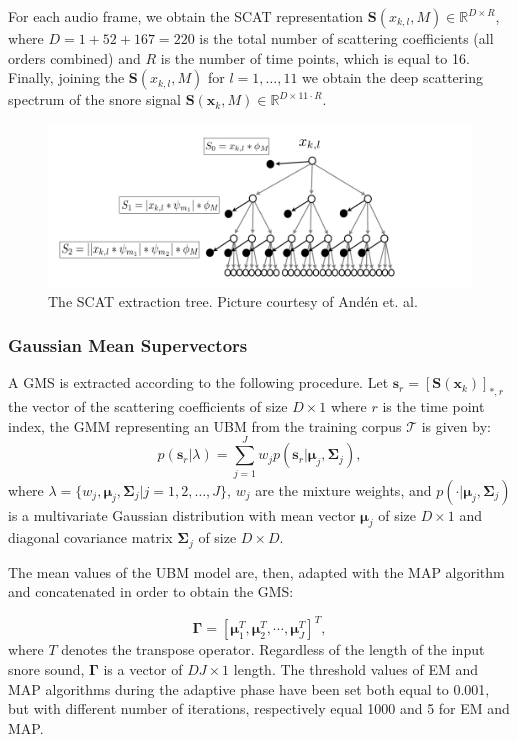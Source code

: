 For each audio frame, we obtain the SCAT representation $\mathbf{S}(x_{k,l}, M) \in \mathbb{R}^{D \times R}$, where $D=1+52+167=220$ is the total number of scattering coefficients (all orders combined) and $R$ is the number of time points, which is equal to 16. Finally, joining the $\mathbf{S}(x_{k,l}, M)$ for $l=1,\dots,11$ we obtain the deep scattering spectrum of the snore signal $\mathbf{S}(\mathbf{x}_{k}, M) \in \mathbb{R}^{D \times 11\cdot R}$.

\begin{figure}[h]
	\centering
	\includegraphics[scale=0.55]{img/scat_spectr_1}
	\caption[SCAT Extraction Tree]{The SCAT extraction tree. Picture courtesy of And\'{e}n et. al. }
\end{figure}


\subsubsection{Gaussian Mean Supervectors}
A GMS is extracted according to the following procedure. 
Let $\mathbf{s}_r = [\mathbf{S}(\mathbf{x}_{k})]_{*,r}$ the vector of the scattering coefficients of size $D \times 1$ where $r$ is the time point index, the GMM representing an UBM from the training corpus $\mathcal{T}$  is given by:
\begin{equation}\label{eq:ubm}
p(\mathbf{s}_r|\lambda) = \sum_{j=1}^{J}w_j p(\mathbf{s}_r|\boldsymbol{\mu}_j,\boldsymbol{\Sigma}_j),
\end{equation}
where $\lambda=\{w_j,\boldsymbol{\mu}_j,\boldsymbol{\Sigma}_j | j=1,2,\ldots,J\}$, $w_j$ are the mixture weights, and $p(\cdot|\boldsymbol{\mu}_j,\boldsymbol{\Sigma}_j)$ is a multivariate Gaussian distribution with mean vector $\boldsymbol{\mu}_j$ of size $D\times 1$ and diagonal covariance matrix $\boldsymbol{\Sigma}_j$ of size $D \times D$.

The mean values of the UBM model are, then, adapted with the MAP algorithm and concatenated in order to obtain the GMS:

\begin{equation}
\mathbf{\Gamma} = [\boldsymbol{\mu}_1^T,\boldsymbol{\mu}_2^T,\cdots,\boldsymbol{\mu}_J^T]^T,
\end{equation}
where $T$ denotes the transpose operator. Regardless of the length of the input snore sound, $\mathbf{\Gamma}$ is a vector of $DJ\times 1$ length. The threshold values of EM and MAP algorithms during the adaptive phase have been set both equal to 0.001, but with different number of iterations, respectively equal 1000 and 5 for EM and MAP.

